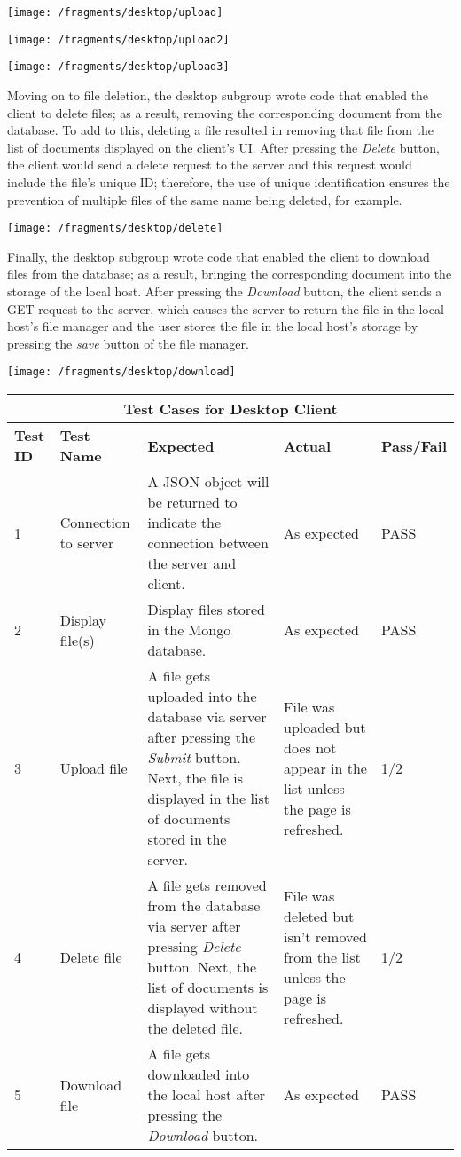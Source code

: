 \documentclass{article}
\begin{document}
\texttt{[image: /fragments/desktop/upload]}

\texttt{[image: /fragments/desktop/upload2]}

\texttt{[image: /fragments/desktop/upload3]}

Moving on to file deletion, the desktop subgroup wrote code that enabled the client to delete files; as a result, removing the corresponding document from the database. To add to this, deleting a file resulted in removing that file from the list of documents displayed on the client's UI. After pressing the \textit{Delete} button, the client would send a delete request to the server and this request would include the file's unique ID; therefore, the use of unique identification ensures the prevention of multiple files of the same name being deleted, for example.

\texttt{[image: /fragments/desktop/delete]}

Finally, the desktop subgroup wrote code that enabled the client to download files from the database; as a result, bringing the corresponding document into the storage of the local host. After pressing the \textit{Download} button, the client sends a GET request to the server, which causes the server to return the file in the local host's file manager and the user stores the file in the local host's storage by pressing the \textit{save} button of the file manager.

\texttt{[image: /fragments/desktop/download]}

\begin{tabular}{|p{2cm}|p{2cm}|p{3cm}|p{3cm}|p{3cm}|}
\hline
\multicolumn{5}{|c|}{\textbf{Test Cases for Desktop Client}} \\
\hline
\textbf{Test ID} & \textbf{Test Name} & \textbf{Expected} & \textbf{Actual} & \textbf{Pass/Fail} \\
\hline
1 & Connection to server & A JSON object will be returned to indicate the connection between the server and client.  & As expected & PASS \\
\hline
2 & Display file(s) & Display files stored in the Mongo database. & As expected & PASS \\
\hline
3 & Upload file & A file gets uploaded into the database via server after pressing the \textit{Submit} button. Next, the file is displayed in the list of documents stored in the server. & File was uploaded but does not appear in the list unless the page is refreshed. & 1/2 \\
\hline
4 & Delete file & A file gets removed from the database via server after pressing \textit{Delete} button. Next, the list of documents is displayed without the deleted file. & File was deleted but isn't removed from the list unless the page is refreshed. & 1/2 \\
\hline
5 & Download file & A file gets downloaded into the local host after pressing the \textit{Download} button. & As expected & PASS \\
\hline
\end{tabular}
\end{document}
